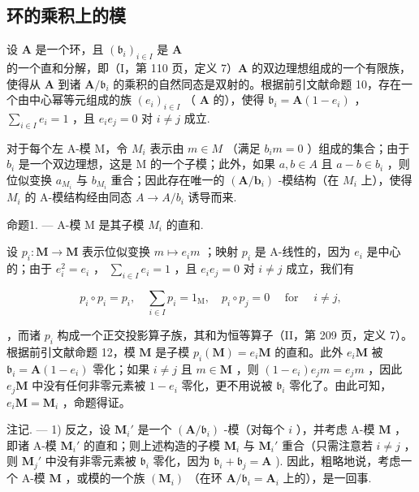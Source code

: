 \subsection{环的乘积上的模}

设 \(\mathbf{A}\) 是一个环，且 \((\mathfrak{b}_i)_{i\in I}\) 是 \(\mathbf{A}\) 的一个直和分解，即（I，第 110 页，定义 7）\(\mathbf{A}\) 的双边理想组成的一个有限族，使得从 \(\mathbf{A}\) 到诸 \(\mathbf{A} / \mathfrak{b}_i\) 的乘积的自然同态是双射的。根据前引文献命题 10，存在一个由中心幂等元组成的族 \((e_i)_{i\in I}\) （ \(\mathbf{A}\) 的），使得 \(\mathfrak{b}_i = \mathbf{A}(1 - e_i)\) ， \(\sum_{i\in I}e_i = 1\) ，且 \(e_i e_j = 0\) 对 \(i\neq j\) 成立.

对于每个左 A-模 M，令 \(M_{i}\) 表示由 \(m \in M\) （满足 \(b_{i}m = 0\) ）组成的集合；由于 \(b_{i}\) 是一个双边理想，这是 M 的一个子模；此外，如果 \(a, b \in A\) 且 \(a - b \in b_{i}\) ，则位似变换 \(a_{M_{i}}\) 与 \(b_{M_{i}}\) 重合；因此存在唯一的 \((\mathbf{A}/\mathbf{b}_{i})\) -模结构（在 \(M_{i}\) 上），使得 \(M_{i}\) 的 A-模结构经由同态 \(A \to A/b_{i}\) 诱导而来.

命题1. --- A-模 M 是其子模 \(M_{i}\) 的直和.

设 \(p_i: \mathbf{M} \to \mathbf{M}\) 表示位似变换 \(m \mapsto e_i m\) ；映射 \(p_i\) 是 A-线性的，因为 \(e_i\) 是中心的；由于 \(e_i^2 = e_i\) ， \(\sum_{i \in I} e_i = 1\) ，且 \(e_i e_j = 0\) 对 \(i \neq j\) 成立，我们有

\[
p _ {i} \circ p _ {i} = p _ {i}, \quad \sum_ {i \in I} p _ {i} = 1 _ {\mathrm{M}}, \quad p _ {i} \circ p _ {j} = 0 \quad \text { for } \quad i \neq j,
\]

，而诸 \(p_i\) 构成一个正交投影算子族，其和为恒等算子（II，第 209 页，定义 7）。根据前引文献命题 12，模 \(\mathbf{M}\) 是子模 \(p_i(\mathbf{M}) = e_i\mathbf{M}\) 的直和。此外 \(e_i\mathbf{M}\) 被 \(\mathfrak{b}_i = \mathbf{A}(1 - e_i)\) 零化；如果 \(i \neq j\) 且 \(m \in \mathbf{M}\) ，则 \((1 - e_i)e_jm = e_jm\) ，因此 \(e_j\mathbf{M}\) 中没有任何非零元素被 \(1 - e_i\) 零化，更不用说被 \(\mathfrak{b}_i\) 零化了。由此可知， \(e_i\mathbf{M} = \mathbf{M}_i\) ，命题得证。

注记. --- 1) 反之，设 \(\mathbf{M}_i'\) 是一个 \((\mathbf{A} / \mathfrak{b}_i)\) -模（对每个 \(i\) ），并考虑 A-模 \(\mathbf{M}\) ，即诸 A-模 \(\mathbf{M}_i'\) 的直和；则上述构造的子模 \(\mathbf{M}_i\) 与 \(\mathbf{M}_i'\) 重合（只需注意若 \(i \neq j\) ，则 \(\mathbf{M}_j'\) 中没有非零元素被 \(\mathfrak{b}_i\) 零化，因为 \(\mathfrak{b}_i + \mathfrak{b}_j = \mathbf{A}\) ). 因此，粗略地说，考虑一个 A-模 \(\mathbf{M}\) ，或模的一个族 \((\mathbf{M}_i)\) （在环 \(\mathbf{A} / \mathfrak{b}_i = \mathbf{A}_i\) 上的），是一回事.

